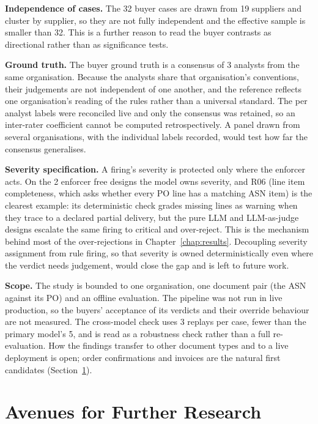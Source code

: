\textbf{Independence of cases.} The 32 buyer cases are drawn from 19 suppliers and cluster by supplier, so they are not fully independent and the effective sample is smaller than 32. This is a further reason to read the buyer contrasts as directional rather than as significance tests.

\textbf{Ground truth.} The buyer ground truth is a consensus of 3 analysts from the same organisation. Because the analysts share that organisation's conventions, their judgements are not independent of one another, and the reference reflects one organisation's reading of the rules rather than a universal standard. The per analyst labels were reconciled live and only the consensus was retained, so an inter-rater coefficient cannot be computed retrospectively. A panel drawn from several organisations, with the individual labels recorded, would test how far the consensus generalises.

\textbf{Severity specification.} A firing's severity is protected only where the enforcer acts. On the 2 enforcer free designs the model owns severity, and R06 (line item completeness, which asks whether every PO line has a matching ASN item) is the clearest example: its deterministic check grades missing lines as warning when they trace to a declared partial delivery, but the pure LLM and LLM-as-judge designs escalate the same firing to critical and over-reject. This is the mechanism behind most of the over-rejections in Chapter~\ref{chap:results}. Decoupling severity assignment from rule firing, so that severity is owned deterministically even where the verdict needs judgement, would close the gap and is left to future work.

\textbf{Scope.} The study is bounded to one organisation, one document pair (the ASN against its PO) and an offline evaluation. The pipeline was not run in live production, so the buyers' acceptance of its verdicts and their override behaviour are not measured. The cross-model check uses 3 replays per case, fewer than the primary model's 5, and is read as a robustness check rather than a full re-evaluation. How the findings transfer to other document types and to a live deployment is open; order confirmations and invoices are the natural first candidates (Section~\ref{sec:concl:future}).

\section{Avenues for Further Research}
\label{sec:concl:future}

